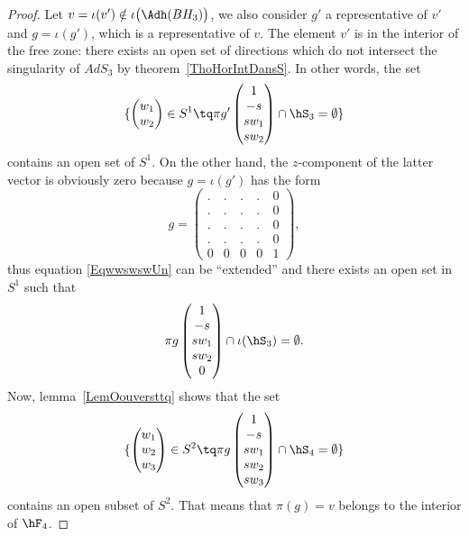 \begin{proof}

	Let $v=\iota(v')\notin\iota\big( \Adh(BH_3) \big)$, we also consider $g'$ a representative of $v'$ and $g=\iota(g')$, which is a representative of $v$. The element $v'$ is in the interior of the free zone: there exists an open set of directions which do not intersect the singularity of $AdS_3$ by theorem~\ref{ThoHorIntDansS}. In other words, the set
\begin{equation}		\label{EqwwswswUn}
	\{ \begin{pmatrix}
	w_1	\\
	w_2
\end{pmatrix}\in S^1\tq
\pi g'\begin{pmatrix}
	1	\\
	-s	\\
	sw_1	\\
	sw_2
\end{pmatrix}\cap\hS_3 =\emptyset\}
\end{equation}
contains an open set of $S^1$. On the other hand, the $z$-component of the latter vector is obviously zero because $g=\iota(g')$ has the form
\begin{equation}
	g=\begin{pmatrix}
 .	&	.	&	.	&	.	&	0\\
 .	&	.	&	.	&	.	&	0\\
 .	&	.	&	.	&	.	&	0\\
 .	&	.	&	.	&	.	&	0\\
0	&	0	&	0	&	0	&	1
 \end{pmatrix},
\end{equation}
thus equation \eqref{EqwwswswUn} can be ``extended'' and there exists an open set in $S^1$ such that
\begin{equation}
	\pi g\begin{pmatrix}
		1	\\
		-s	\\
		sw_1	\\
		sw_2	\\
		0
	\end{pmatrix}\cap\iota(\hS_3)=\emptyset.
\end{equation}
Now, lemma~\ref{LemOouversttq} shows that the set
\begin{equation}
	\{
		\begin{pmatrix}
			w_1	\\
			w_2	\\
			w_3
		\end{pmatrix}\in S^2\tq
		\pi g\begin{pmatrix}
			1	\\
			-s	\\
			sw_1	\\
			sw_2	\\
			sw_3
		\end{pmatrix}\cap\hS_4=\emptyset
	\}
\end{equation}
contains an open subset of $S^2$. That means that $\pi(g)=v$ belongs to the interior of $\hF_4$.
\end{proof}

